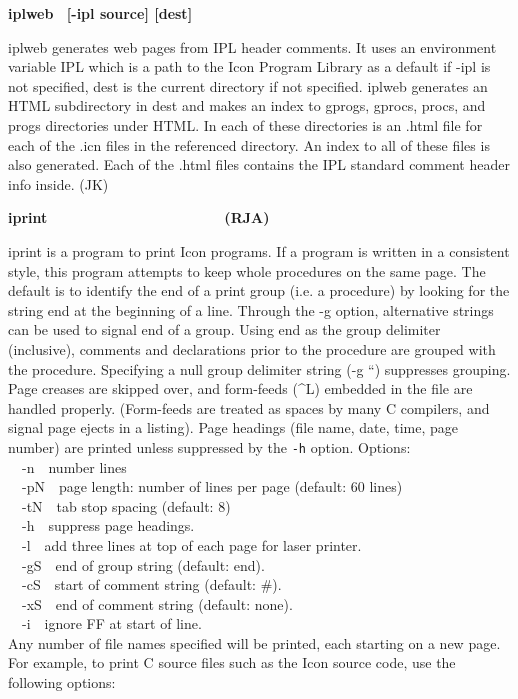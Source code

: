 {\sffamily\bfseries
iplweb \ \textrm{\textmd{[-ipl source] [dest]}}}

\textsf{iplweb} generates web pages from IPL header
comments. It uses an environment variable IPL which is a path to the Icon
Program Library as a default if \textsf{{}-ipl} is not specified,
\textsf{dest} is the current directory if not specified.
\textsf{iplweb} generates an HTML subdirectory in
\textsf{dest} and makes an index to \textsf{gprogs}, \textsf{gprocs},
\textsf{procs}, and \textsf{progs} directories under HTML. In each of
these directories is an \textsf{.html} file for each of the
\textsf{.icn} files in the referenced directory. An index to all of
these files is also generated. Each of the \textsf{.html} files
contains the IPL standard comment header info inside. (JK)

{\sffamily\bfseries
iprint\ \ \ \ \ \ \ \ \ \ \ \ \ \ \ \ \ \ \ \ \ \ (RJA)}

\textsf{iprint} is a program to print Icon programs. If a program is
written in a consistent style, this program attempts to keep whole
procedures on the same page. The default is to identify the end of a
print group (i.e. a procedure) by looking for the string
{\textquotedbl}end{\textquotedbl} at the beginning of a line. Through
the -g option, alternative strings can be used to signal end of a
group. Using {\textquotedbl}end{\textquotedbl} as the group delimiter
(inclusive), comments and declarations prior to the procedure are
grouped with the procedure. Specifying a null group delimiter string
(\textsf{{}-g {\textquotedblleft}{\textquotedbl}}) suppresses grouping.
Page creases are skipped over, and form-feeds (\^{}L) embedded in the
file are handled properly. (Form-feeds are treated as spaces by many C
compilers, and signal page ejects in a listing). Page headings (file
name, date, time, page number) are printed unless suppressed by the
\texttt{{}-h} option. Options:\\
\ \ \textsf{{}-n}\ \ number lines\\
\ \ \textsf{{}-pN}\ \ page length: number of lines per page (default: 60
lines)\\
\ \ \textsf{{}-tN}\ \ tab stop spacing (default: 8)\\
\ \ \textsf{{}-h}\ \ suppress page headings.\\
\ \ \textsf{{}-l}\ \ add three lines at top of each page for laser
printer.\\
\ \ \textsf{{}-gS}\ \ end of group string (default:
{\textquotedbl}end{\textquotedbl}).\\
\ \ \textsf{{}-cS}\ \ start of comment string (default:
{\textquotedbl}\#{\textquotedbl}).\\
\ \ \textsf{{}-xS}\ \ end of comment string (default: none).\\
\ \ \textsf{{}-i}\ \  ignore FF at start of line.\\
Any number of file names specified will be printed, each starting on a
new page. For example, to print C source files such as the Icon source
code, use the following options:


